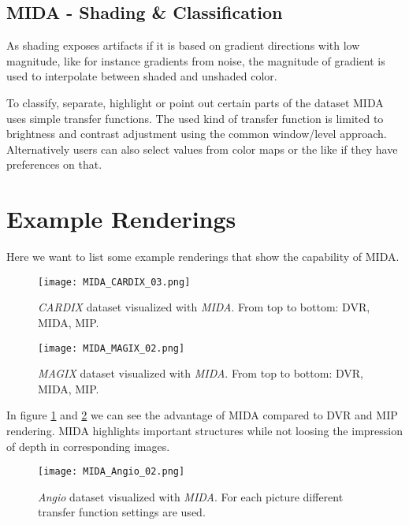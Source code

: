 \subsection{MIDA - Shading \& Classification}

As shading exposes artifacts if it is based on gradient directions with low magnitude, like for instance gradients from noise, the magnitude of gradient is used to interpolate between shaded and unshaded color.

To classify, separate, highlight or point out certain parts of the dataset MIDA uses simple transfer functions.
The used kind of transfer function is limited to brightness and contrast adjustment using the common window/level approach.
Alternatively users can also select values from color maps or the like if they have preferences on that.


\section{Example Renderings}

Here we want to list some example renderings that show the capability of MIDA.

\begin{figure}[h]
	\centering
	\texttt{[image: MIDA\_CARDIX\_03.png]} \\
	\caption{ \emph{CARDIX}\cite{gimias_sampledata_2018} dataset visualized with \emph{MIDA}. From top to bottom: DVR, MIDA, MIP.}
	\label{fig:MIDA_CARDIX_03}
\end{figure}


\begin{figure}[h]
	\centering
	\texttt{[image: MIDA\_MAGIX\_02.png]} \\
	\caption{ \emph{MAGIX}\cite{gimias_sampledata_2018} dataset visualized with \emph{MIDA}. From top to bottom: DVR, MIDA, MIP.}
	\label{fig:MIDA_MAGIX_02}
\end{figure}

In figure \ref{fig:MIDA_CARDIX_03} and \ref{fig:MIDA_MAGIX_02} we can see the advantage of MIDA compared to DVR and MIP rendering. MIDA highlights important structures while not loosing the impression of depth in corresponding images.

\begin{figure}[h]
	\centering
	\texttt{[image: MIDA\_Angio\_02.png]} \\
	\caption{ \emph{Angio}\cite{roettger_VOL_2018} dataset visualized with \emph{MIDA}. For each picture different transfer function settings are used.}
	\label{fig:MIDA_Angio_02}
\end{figure}

